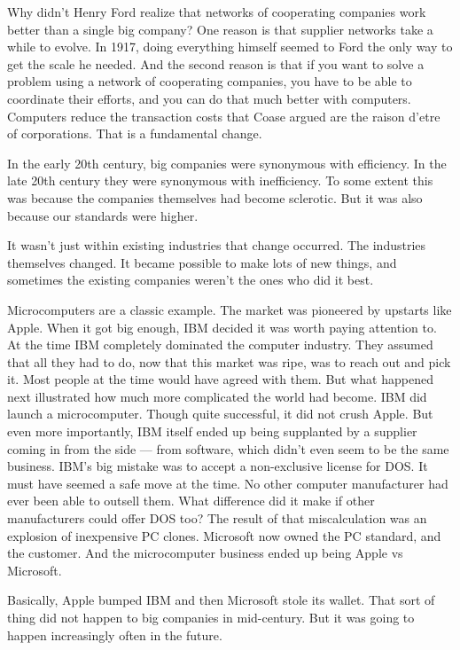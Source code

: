 Why didn't Henry Ford realize that networks of cooperating companies
work better than a single big company? One reason is that supplier
networks take a while to evolve. In 1917, doing everything himself
seemed to Ford the only way to get the scale he needed. And the second
reason is that if you want to solve a problem using a network of
cooperating companies, you have to be able to coordinate their efforts,
and you can do that much better with computers. Computers reduce the
transaction costs that Coase argued are the raison d'etre of
corporations. That is a fundamental change.

In the early 20th century, big companies were synonymous with
efficiency. In the late 20th century they were synonymous with
inefficiency. To some extent this was because the companies themselves
had become sclerotic. But it was also because our standards were higher.

It wasn't just within existing industries that change occurred. The
industries themselves changed. It became possible to make lots of new
things, and sometimes the existing companies weren't the ones who did it
best.

Microcomputers are a classic example. The market was pioneered by
upstarts like Apple. When it got big enough, IBM decided it was worth
paying attention to. At the time IBM completely dominated the computer
industry. They assumed that all they had to do, now that this market was
ripe, was to reach out and pick it. Most people at the time would have
agreed with them. But what happened next illustrated how much more
complicated the world had become. IBM did launch a microcomputer. Though
quite successful, it did not crush Apple. But even more importantly, IBM
itself ended up being supplanted by a supplier coming in from the side
--- from software, which didn't even seem to be the same business. IBM's
big mistake was to accept a non-exclusive license for DOS. It must have
seemed a safe move at the time. No other computer manufacturer had ever
been able to outsell them. What difference did it make if other
manufacturers could offer DOS too? The result of that miscalculation was
an explosion of inexpensive PC clones. Microsoft now owned the PC
standard, and the customer. And the microcomputer business ended up
being Apple vs Microsoft.

Basically, Apple bumped IBM and then Microsoft stole its wallet. That
sort of thing did not happen to big companies in mid-century. But it was
going to happen increasingly often in the future.

